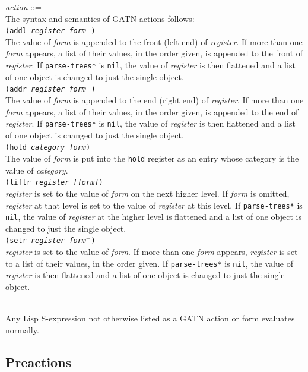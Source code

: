 \documentclass{book}
\begin{document}
{\it action} ::= \\
The syntax and semantics of GATN actions follows: \\[2ex]
{\tt (addl {\it register form$^+$})} \\ The value of {\it form} is appended to the front (left end)
of {\it register}.  If more than one {\it form} appears, a list of their values, in the order given,
is appended to the front of {\it register}.  If {\tt *parse-trees*} is {\tt nil}, the value of {\it
register} is then flattened and a list of one object is changed to just the single object.  \\[2ex]
{\tt (addr {\it register form$^+$})} \\ The value of {\it form} is appended to the end (right end)
of {\it register}.  If more than one {\it form} appears, a list of their values, in the order given,
is appended to the end of {\it register}.  If {\tt *parse-trees*} is {\tt nil}, the value of {\it
register} is then flattened and a list of one object is changed to just the single object.  \\[2ex]
{\tt (hold {\it category form})} \\ The value of {\it form} is put
into the {\tt hold} register as 
an entry whose category is the value of {\it category}.  \\[2ex]
{\tt (liftr {\it register [form]})} \\ {\it register} is set to the value of {\it form} on the next
higher level.  If {\it form} is omitted, {\it register} at that level is set to the value of {\it
register} at this level.  If {\tt *parse-trees*} is {\tt nil}, the value of {\it register} at the
higher level is flattened and a list of one object is changed to just the single object.  \\[2ex]
{\tt (setr {\it register form$^+$})} \\ {\it register} is set to the value of {\it form}.  If more
than one {\it form} appears, {\it register} is set to a list of their values, in the order given.
If {\tt *parse-trees*} is {\tt nil}, the value of {\it register} is then flattened and a list of one
object is changed to just the single object.

 \\ Any Lisp S-expression not otherwise listed as a GATN action or form evaluates
normally.

\subsection{Preactions}
\end{document}
